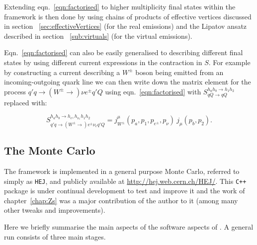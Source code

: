 		Extending eqn.~\eqref{eqn:factorised} to higher multiplicity final states within the \hej
		framework is then done by using chains of products of effective vertices discussed in section
		~\eqref{sec:effectiveVertices} (for the real emissions) and the Lipatov ansatz described in section
		~\eqref{sub:virtuals} (for the virtual emissions).

		Eqn.~\eqref{eqn:factorised} can also be easily generalised to describing different final states by using
		different current expressions in the contraction in $S$.  For example by constructing a current
		describing a $W^\pm$ boson being emitted from an incoming-outgoing quark line we can then write down
		the matrix element for the process $q'q\to(W^\pm\to)\nu e^\pm q'Q$ using eqn.~\eqref{eqn:factorised}
		with $S_{qQ\rightarrow qQ}^{h_ah_b\rightarrow h_1h_2}$ replaced with:

		\begin{equation}
			S_{q'q\to(W^\pm\to)e^\pm\nu_eq'Q}^{h_ah_b\to h_{e^\pm}h_{\nu_e}h_1h_2} =
			{j^\mu_{W^\pm}(p_a, p_1, p_{e^\pm}, p_\nu)\ j_\mu(p_b, p_2)}.
			\label{eqn:wExample}
		\end{equation}

	\subsection{The \hej Monte Carlo}

		The \hej framework is implemented in a general purpose Monte Carlo, referred to simply as
		\texttt{HEJ}, and publicly available at \url{http://hej.web.cern.ch/HEJ/}.  This
		\texttt{C++} package is under continual development to test and improve it and the work
		of chapter~\ref{chap:Zs} was a major contribution of the author to it (among many other
		tweaks and improvements).

		Here we briefly summarise the main aspects of the software aspects of \hej.  A general
		\HEJ run consists of three main stages.

